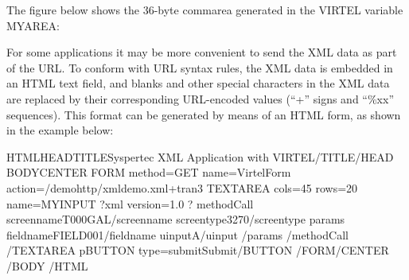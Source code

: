 \documentclass[letterpaper,10pt,english]{sphinxmanual}
\begin{document}


The figure below shows the 36-byte commarea generated in the VIRTEL variable MYAREA:

\begin{sphinxVerbatim}[commandchars=\\\{\}]
\end{sphinxVerbatim}

\label{\detokenize{User_Guide:v457ug-sending-xml}}

For some applications it may be more convenient to send the XML data as part of the URL. To conform with URL syntax
rules, the XML data is embedded in an HTML text field, and blanks and other special characters in the XML data are
replaced by their corresponding URL-encoded values (“+” signs and “\%xx” sequences). This format can be generated
by means of an HTML form, as shown in the example below:

\begin{sphinxVerbatim}[commandchars=\\\{\}]
\PYGZlt{}HTML\PYGZgt{}\PYGZlt{}HEAD\PYGZgt{}\PYGZlt{}TITLE\PYGZgt{}Syspertec \PYGZhy{} XML Application with VIRTEL\PYGZlt{}/TITLE\PYGZgt{}\PYGZlt{}/HEAD\PYGZgt{}
\PYGZlt{}BODY\PYGZgt{}\PYGZlt{}CENTER\PYGZgt{}
\PYGZlt{}FORM method=GET name=\PYGZdq{}VirtelForm\PYGZdq{} action=\PYGZdq{}/demohttp/xmldemo.xml+tran3\PYGZdq{}\PYGZgt{}
\PYGZlt{}TEXTAREA cols=\PYGZdq{}45\PYGZdq{} rows=\PYGZdq{}20\PYGZdq{} name=\PYGZdq{}MYINPUT\PYGZdq{}\PYGZgt{}
\PYGZlt{}?xml version=\PYGZdq{}1.0\PYGZdq{} ?\PYGZgt{}
\PYGZlt{}methodCall\PYGZgt{}
\PYGZlt{}screenname\PYGZgt{}T000\PYGZhy{}GAL\PYGZlt{}/screenname\PYGZgt{}
\PYGZlt{}screentype\PYGZgt{}3270\PYGZlt{}/screentype\PYGZgt{}
\PYGZlt{}params\PYGZgt{}
    \PYGZlt{}fieldname\PYGZgt{}FIELD001\PYGZlt{}/fieldname\PYGZgt{}
    \PYGZlt{}uinput\PYGZgt{}A\PYGZlt{}/uinput\PYGZgt{}
\PYGZlt{}/params\PYGZgt{}
\PYGZlt{}/methodCall\PYGZgt{}
\PYGZlt{}/TEXTAREA\PYGZgt{}
\PYGZlt{}p\PYGZgt{}\PYGZlt{}BUTTON type=\PYGZdq{}submit\PYGZdq{}\PYGZgt{}Submit\PYGZlt{}/BUTTON\PYGZgt{}
\PYGZlt{}/FORM\PYGZgt{}\PYGZlt{}/CENTER\PYGZgt{}
\PYGZlt{}/BODY\PYGZgt{}
\PYGZlt{}/HTML\PYGZgt{}
\end{sphinxVerbatim}
\end{document}
